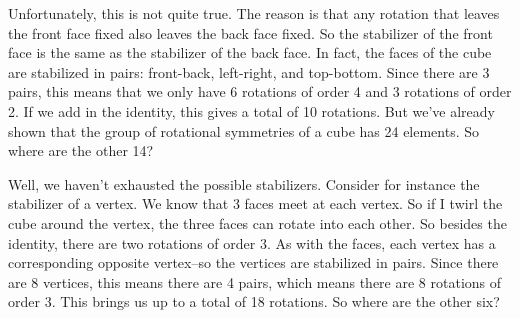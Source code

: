 Unfortunately, this is not quite true. The reason is that any rotation that leaves the front face fixed also leaves the back face fixed. So the stabilizer of the front face is the same as the stabilizer  of the back face. In fact, the faces of the cube are stabilized in pairs: front-back, left-right, and top-bottom. Since there are 3 pairs, this means that we only have 6 rotations of order 4 and 3 rotations of order 2. If we add in the identity, this gives a total of 10 rotations. But we've already shown that the group of rotational symmetries of a cube has 24 elements. So where are the other 14?

Well, we haven't exhausted the possible stabilizers. Consider for instance the stabilizer of a vertex. We know that 3 faces meet at each vertex. So if I twirl the cube around the vertex, the three faces can rotate into each other. So besides the identity, there are two rotations of order 3. As with the faces, each vertex has a corresponding opposite vertex--so the vertices are stabilized in pairs. Since there are 8 vertices, this means there are 4 pairs, which means there are 8 rotations of order 3. This brings us up to a total of 18 rotations. So where are the other six?

